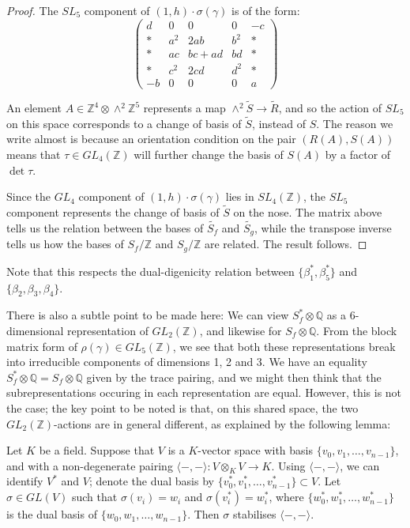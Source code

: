 \documentclass{report}
\begin{document}
\begin{proof}
The $SL_5$ component of $(1,h) \cdot \sigma ( \gamma )$ is of the form:
\begin{equation}
\begin{pmatrix}
d & 0 & 0 & 0 & - c \\
* & a^2 & 2ab & b^2 & * \\
* & ac & bc+ad & bd & * \\
* & c^2 & 2cd & d^2 & * \\
- b & 0 & 0 & 0 & a
\end{pmatrix}
\end{equation}

An element $A \in \mathbb{Z}^4 \otimes \wedge^2 \mathbb{Z}^5$ represents a map $\wedge^2 \tilde{S} \to \tilde{R}$, and so the action of $SL_5$ on this space corresponds to a change of basis of $\tilde{S}$, instead of $S$.  The reason we write almost is because an orientation condition on the pair $(R(A),S(A))$ means that $\tau \in GL_4(\mathbb{Z})$ will further change the basis of $S(A)$ by a factor of $\det \tau$.

Since the $GL_4$ component of $(1,h) \cdot \sigma ( \gamma )$ lies in $SL_4(\mathbb{Z})$, the $SL_5$ component represents the change of basis of $\tilde{S}$ on the nose.  The matrix above tells us the relation between the bases of $\tilde{S_f}$ and $\tilde{S_g}$, while the transpose inverse tells us how the bases of $S_f / \mathbb{Z}$ and $S_g / \mathbb{Z}$ are related.  The result follows.
\end{proof}

Note that this respects the dual-digenicity relation between $\{ \beta_1^*, \beta_5^* \}$ and $\{ \beta_2, \beta_3, \beta_4 \}$.

There is also a subtle point to be made here: We can view $S_f^* \otimes \mathbb{Q}$ as a 6-dimensional representation of $GL_2(\mathbb{Z})$, and likewise for $S_f \otimes \mathbb{Q}$.  From the block matrix form of $\rho (\gamma) \in GL_5(\mathbb{Z})$, we see that both these representations break into irreducible components of dimensions 1, 2 and 3.  We have an equality $S_f^* \otimes \mathbb{Q} = S_f \otimes \mathbb{Q}$ given by the trace pairing, and we might then think that the subrepresentations occuring in each representation are equal.  However, this is not the case; the key point to be noted is that, on this shared space, the two $GL_2(\mathbb{Z})$-actions are in general different, as explained by the following lemma:

\begin{lemma}
Let $K$ be a field.  Suppose that $V$ is a $K$-vector space with basis $\{v_0,v_1,\ldots,v_{n-1}\}$, and with a non-degenerate pairing $\langle -,- \rangle : V \otimes_K V \to K$.  Using $\langle -,- \rangle$, we can identify $V^*$ and $V$; denote the dual basis by $\{v_0^*,v_1^*,\ldots,v_{n-1}^*\} \subset V$.  Let $\sigma \in GL(V)$ such that $\sigma(v_i) = w_i$ and $\sigma(v_i^*) = w_i^*$, where $\{w_0^*,w_1^*,\ldots,w_{n-1}^*\}$ is the dual basis of $\{w_0,w_1,\ldots,w_{n-1}\}$.  Then $\sigma$ stabilises $\langle -,- \rangle$.
\end{lemma}
\end{document}
